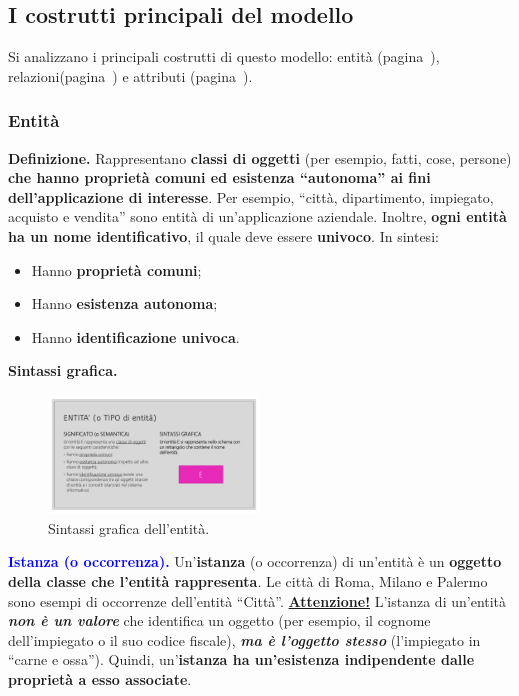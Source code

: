 \documentclass[a4paper]{article}
\newcommand{\dquotes}[1]{``#1''}
\begin{document}
	\newpage
	
	
	
	
	\subsection{I costrutti principali del modello}
	
	Si analizzano i principali costrutti di questo modello: entità (pagina~\pageref{entità}), relazioni(pagina~\pageref{relazioni}) e attributi (pagina~\pageref{attributi}).
	
	\subsubsection{Entità}\label{entità}
	\textcolor{Red3}{\textbf{Definizione.}} Rappresentano \textbf{classi di oggetti} (per esempio, fatti, cose, persone) \textbf{che hanno proprietà comuni ed esistenza \dquotes{autonoma} ai fini dell'applicazione di interesse}. Per esempio, \dquotes{città, dipartimento, impiegato, acquisto e vendita} sono entità di un'applicazione aziendale. Inoltre, \textbf{ogni entità ha un nome identificativo}, il quale deve essere \textbf{univoco}. In sintesi:
	
	\begin{itemize}
		\item Hanno \textbf{proprietà comuni};
		\item Hanno \textbf{esistenza autonoma};
		\item Hanno \textbf{identificazione univoca}.
	\end{itemize}

	\noindent
	\textcolor{Green4}{\textbf{Sintassi grafica.}}
	
	\begin{figure}[!htp]
		\centering
		\includegraphics[width=0.5\textwidth]{img/entita_def.pdf}
		\caption{Sintassi grafica dell'entità.}
	\end{figure}

	\noindent
	\textcolor{blue}{\textbf{Istanza (o occorrenza).}} Un'\textbf{istanza} (o occorrenza) di un'entità è un \textbf{oggetto della classe che l'entità rappresenta}. Le città di Roma, Milano e Palermo sono esempi di occorrenze dell'entità \dquotes{Città}.\newline
	\textbf{\underline{Attenzione!}} L'istanza di un'entità \textbf{\emph{non è un valore}} che identifica un oggetto (per esempio, il cognome dell'impiegato o il suo codice fiscale),\textbf{\emph{ ma è l'oggetto stesso}} (l'impiegato in \dquotes{carne e ossa}). Quindi, un'\textbf{istanza ha un'esistenza indipendente dalle proprietà a esso associate}.
	
\end{document}
